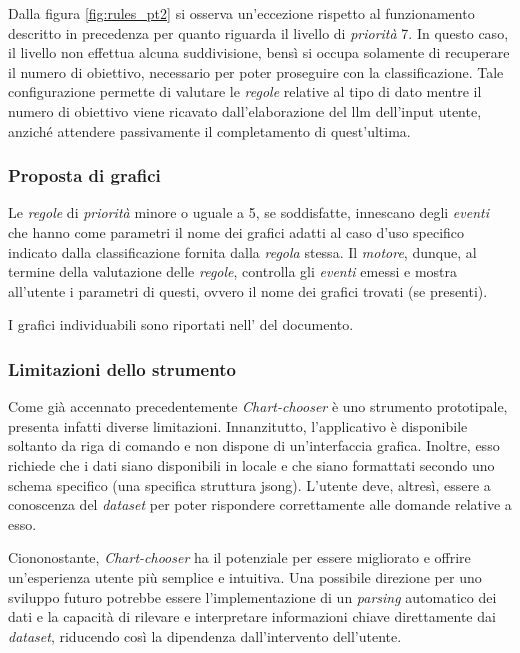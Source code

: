 Dalla figura \ref{fig:rules_pt2} si osserva un'eccezione rispetto al funzionamento descritto in precedenza per quanto riguarda il livello di \emph{priorità} 7. In questo caso, il livello non effettua alcuna suddivisione, 
bensì si occupa solamente di recuperare il numero di obiettivo, necessario per poter proseguire con la classificazione. Tale configurazione permette di valutare le \emph{regole} relative al tipo di dato mentre  
il numero di obiettivo viene ricavato dall'elaborazione del \gls{llm} dell'input utente, anziché attendere passivamente il completamento di quest'ultima.

\subsubsection{Proposta di grafici}
Le \emph{regole} di \emph{priorità} minore o uguale a 5, se soddisfatte, innescano degli \emph{eventi} che hanno come parametri il nome dei grafici adatti al caso d'uso specifico indicato dalla classificazione fornita dalla \emph{regola} stessa. 
Il \emph{motore}, dunque, al termine della valutazione delle \emph {regole}, controlla gli \emph{eventi} emessi e mostra all'utente i parametri di questi, ovvero il nome dei grafici trovati (se presenti).

I grafici individuabili sono riportati nell' del documento.

\subsubsection{Limitazioni dello strumento}
Come già accennato precedentemente \emph{Chart-chooser} è uno strumento prototipale, presenta infatti diverse limitazioni.
Innanzitutto, l'applicativo è disponibile soltanto da riga di comando e non dispone di un'interfaccia grafica.
Inoltre, esso richiede che i dati siano disponibili in locale e che siano formattati secondo uno schema specifico
(una specifica struttura \gls{jsong}). 
L'utente deve, altresì, essere a conoscenza del \emph{dataset} per poter rispondere correttamente alle domande relative a esso.

Ciononostante, \emph{Chart-chooser} ha il potenziale per essere migliorato e offrire un'esperienza utente più semplice e intuitiva. 
Una possibile direzione per uno sviluppo futuro potrebbe essere l'implementazione di un \emph{parsing} automatico dei dati e la capacità di 
rilevare e interpretare informazioni chiave direttamente dai \emph{dataset}, riducendo così la dipendenza dall'intervento dell'utente. 